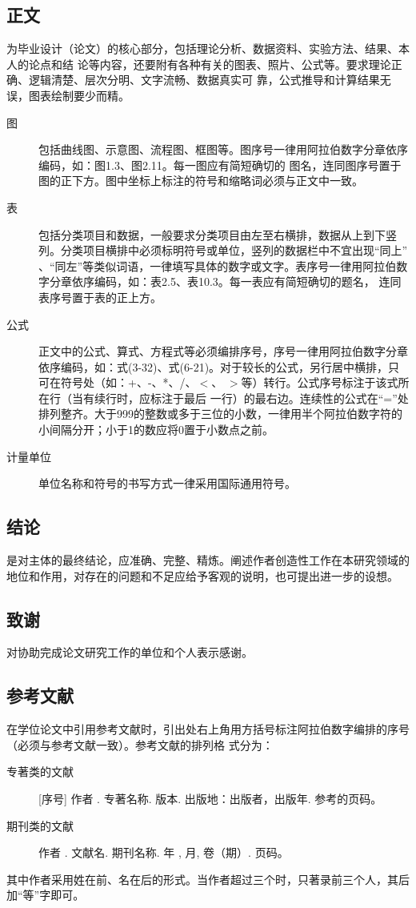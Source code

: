 \subsection{正文} 为毕业设计（论文）的核心部分，包括理论分析、数据资料、实验方法、结果、本人的论点和结
论等内容，还要附有各种有关的图表、照片、公式等。要求理论正确、逻辑清楚、层次分明、文字流畅、数据真实可
靠，公式推导和计算结果无误，图表绘制要少而精。
\begin{description}
  \item[图] 包括曲线图、示意图、流程图、框图等。图序号一律用阿拉伯数字分章依序编码，如：图1.3、图2.11。每一图应有简短确切的
      图名，连同图序号置于图的正下方。图中坐标上标注的符号和缩略词必须与正文中一致。
  \item[表] 包括分类项目和数据，一般要求分类项目由左至右横排，数据从上到下竖列。分类项目横排中必须标明符号或单位，竖列的数据栏中不宜出现``同上'' 、``同左''等类似词语，一律填写具体的数字或文字。表序号一律用阿拉伯数字分章依序编码，如：表2.5、表10.3。每一表应有简短确切的题名，
      连同表序号置于表的正上方。
  \item[公式] 正文中的公式、算式、方程式等必须编排序号，序号一律用阿拉伯数字分章依序编码，如：式(3-32)、式(6-21)。对于较长的公式，另行居中横排，只可在符号处（如：+、-、*、/、$<$、 $>$等）转行。公式序号标注于该式所在行（当有续行时，应标注于最后 一行）的最右边。连续性的公式在``=''处排列整齐。大于999的整数或多于三位的小数，一律用半个阿拉伯数字符的小间隔分开；小于1的数应将0置于小数点之前。
  \item[计量单位] 单位名称和符号的书写方式一律采用国际通用符号。
\end{description}

\subsection{结论}
是对主体的最终结论，应准确、完整、精炼。阐述作者创造性工作在本研究领域的地位和作用，对存在的问题和不足应给予客观的说明，也可提出进一步的设想。

\subsection{致谢}
对协助完成论文研究工作的单位和个人表示感谢。

\subsection{参考文献}
在学位论文中引用参考文献时，引出处右上角用方括号标注阿拉伯数字编排的序号（必须与参考文献一致）。参考文献的排列格
式分为：
\begin{description}
  \item[专著类的文献] [序号]  作者 . 专著名称.  版本. 出版地：出版者，出版年. 参考的页码。
  \item[期刊类的文献] 作者 . 文献名. 期刊名称.  年 , 月,  卷（期）. 页码。
\end{description}
其中作者采用姓在前、名在后的形式。当作者超过三个时，只著录前三个人，其后
加``等''字即可。


